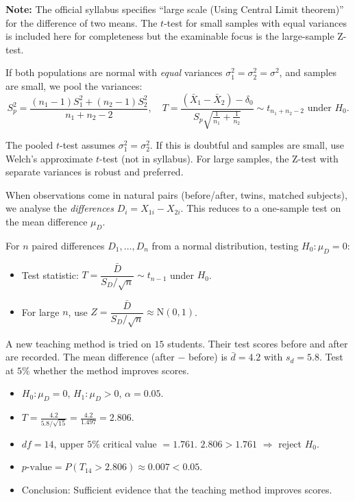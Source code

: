 \documentclass[11pt]{article}
\newcounter{popsec}
\newcounter{popsub}
\newcommand{\courssub}[1]{%
  \stepcounter{popsub}%
  \par\vspace{9pt}\noindent{\popxbold\fontsize{11.5}{13}\selectfont\color{popink}{\color{poporange}\thepopsec.\thepopsub}\hspace{6pt}#1}\par\nopagebreak\vspace{4pt}
}
\begin{document}
\textbf{Note:} The official syllabus specifies ``large scale (Using Central Limit theorem)'' for the difference of two means. The $t$-test for small samples with equal variances is included here for completeness but the examinable focus is the large-sample Z-test.

\begin{propriete}
If both populations are normal with \emph{equal} variances $\sigma_1^2 = \sigma_2^2 = \sigma^2$, and samples are small, we pool the variances:
\[ S_p^2 = \frac{(n_1-1)S_1^2 + (n_2-1)S_2^2}{n_1 + n_2 - 2}, \quad T = \frac{(\bar{X}_1 - \bar{X}_2) - \delta_0}{S_p\sqrt{\frac{1}{n_1} + \frac{1}{n_2}}} \sim t_{n_1+n_2-2} \text{ under } H_0. \]
\end{propriete}

\begin{attention}
The pooled $t$-test assumes $\sigma_1^2 = \sigma_2^2$. If this is doubtful and samples are small, use Welch's approximate $t$-test (not in syllabus). For large samples, the Z-test with separate variances is robust and preferred.
\end{attention}

\courssub{Paired Samples (Matched Pairs)}

When observations come in natural pairs (before/after, twins, matched subjects), we analyse the \emph{differences} $D_i = X_{1i} - X_{2i}$. This reduces to a one-sample test on the mean difference $\mu_D$.

\begin{propriete}
For $n$ paired differences $D_1,\dots,D_n$ from a normal distribution, testing $H_0 : \mu_D = 0$:
\begin{itemize}
\item Test statistic: $T = \dfrac{\bar{D}}{S_D/\sqrt{n}} \sim t_{n-1}$ under $H_0$.
\item For large $n$, use $Z = \dfrac{\bar{D}}{S_D/\sqrt{n}} \approx \mathrm{N}(0,1)$.
\end{itemize}
\end{propriete}

\begin{exemplebox}
A new teaching method is tried on $15$ students. Their test scores before and after are recorded. The mean difference (after $-$ before) is $\bar{d} = 4.2$ with $s_d = 5.8$. Test at $5\%$ whether the method improves scores.
\begin{itemize}
\item $H_0 : \mu_D = 0$, $H_1 : \mu_D > 0$, $\alpha = 0.05$.
\item $T = \frac{4.2}{5.8/\sqrt{15}} = \frac{4.2}{1.497} = 2.806$.
\item $df = 14$, upper $5\%$ critical value $= 1.761$. $2.806 > 1.761$ $\Rightarrow$ reject $H_0$.
\item $p\text{-value} = P(T_{14} > 2.806) \approx 0.007 < 0.05$.
\item Conclusion: Sufficient evidence that the teaching method improves scores.
\end{itemize}
\end{exemplebox}
\end{document}

